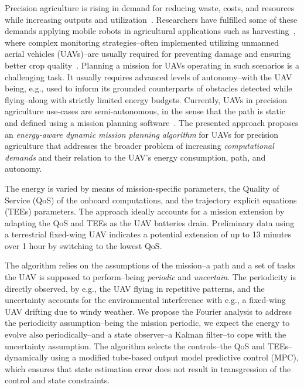 \documentclass[letterpaper,10pt,conference]{ieeeconf}
\begin{document}
Precision agriculture is rising in demand for reducing waste, costs, and resources while increasing outputs and utilization~\cite{hajjaj2014review}. Researchers have fulfilled some of these demands applying mobile robots in agricultural applications such as harvesting~\cite{qingchun2012study,dong2011development, de2011design, aljanobi2010setup, li2008analysis, edan2000robotic}, where complex monitoring strategies--often implemented utilizing unmanned aerial vehicles (UAVs)--are usually required for preventing damage and ensuring better crop quality~\cite{puri2017agriculture}. Planning a mission for UAVs operating in such scenarios is a challenging task. It usually requires advanced levels of autonomy--with the UAV being, e.g., used to inform its grounded counterparts of obstacles detected while flying--along with strictly limited energy budgets. Currently, UAVs in precision agriculture use-cases are semi-autonomous, in the sense that the path is static and defined using a mission planning software~\cite{daponte2019review}. The presented approach proposes an \emph{energy-aware dynamic mission planning algorithm} for UAVs for precision agriculture that addresses the broader problem of increasing \emph{computational demands} and their relation to the UAV's energy consumption, path, and autonomy.

The energy is varied by means of mission-specific parameters, the Quality of Service (QoS) of the onboard computations, and the trajectory explicit equations (TEEs) parameters. The approach ideally accounts for a mission extension by adapting the QoS and TEEs as the UAV batteries drain. Preliminary data using a terrestrial fixed-wing UAV indicates a potential extension of up to 13 minutes over 1 hour by switching to the lowest QoS.

The algorithm relies on the assumptions of the mission--a path and a set of tasks the UAV is supposed to perform--being \emph{periodic} and \emph{uncertain}. The periodicity is directly observed, by e.g., the UAV flying in repetitive patterns, and the uncertainty accounts for the environmental interference with e.g., a fixed-wing UAV drifting due to windy weather. We propose the Fourier analysis to address the periodicity assumption--being the mission periodic, we expect the energy to evolve also periodically--and a state observer--a Kalman filter--to cope with the uncertainty assumption. The algorithm selects the controls--the QoS and TEEs--dynamically using a modified tube-based output model predictive control (MPC), which ensures that state estimation error does not result in transgression of the control and state constraints.
\end{document}
